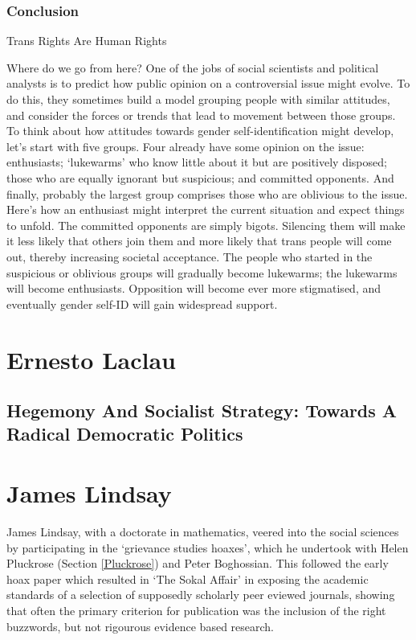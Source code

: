 \documentclass[10pt,titlepage]{book}
\begin{document}
\subsubsection{Conclusion}

Trans Rights Are Human Rights

Where do we go from here? One of the jobs of social scientists and political analysts is to predict how public opinion on a controversial issue might evolve. To do this, they sometimes build a model grouping people with similar attitudes, and consider the forces or trends that lead to movement between those groups. To think about how attitudes towards gender self-identification might develop, let’s start with five groups. Four already have some opinion on the issue: enthusiasts; ‘lukewarms’ who know little about it but are positively disposed; those who are equally ignorant but suspicious; and committed opponents. And finally, probably the largest group comprises those who are oblivious to the issue. Here’s how an enthusiast might interpret the current situation and expect things to unfold. The committed opponents are simply bigots. Silencing them will make it less likely that others join them and more likely that trans people will come out, thereby increasing societal acceptance. The people who started in the suspicious or oblivious groups will gradually become lukewarms; the lukewarms will become enthusiasts. Opposition will become ever more stigmatised, and eventually gender self-ID will gain widespread support.


\section{Ernesto Laclau}

\subsection{Hegemony And Socialist Strategy: Towards A Radical Democratic Politics \cite{laclau-hegsoc}}

\section{James Lindsay}

James Lindsay, with a doctorate in mathematics, veered into the social sciences by participating in the `grievance studies hoaxes', which he undertook with Helen Pluckrose (Section \ref{Pluckrose}) and Peter Boghossian.
This followed the early hoax paper which resulted in `The Sokal Affair' \cite{sokal1998} in exposing the academic standards of a selection of supposedly scholarly peer eviewed journals, showing that often the primary criterion for publication was the inclusion of the right buzzwords, but not rigourous evidence based research.
\end{document}

